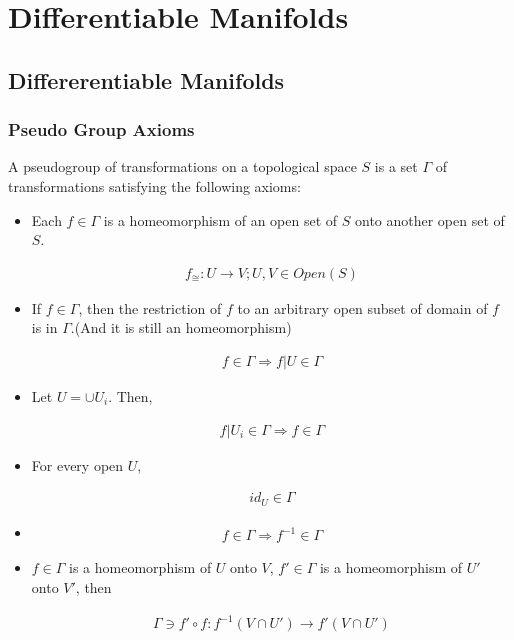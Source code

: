 \documentclass[Total.tex]{subfiles}
\begin{document}
	\chapter{Differentiable Manifolds}
	
		\section{Differerentiable Manifolds}
			\subsection{Pseudo Group Axioms}
				
				\begin{Def}
					A pseudogroup of transformations on a topological space $S$ is a set $\Gamma$ of transformations satisfying the following axioms:
					
					\begin{itemize}
						\item Each $f\in\Gamma$ is a homeomorphism of an open set of $S$ onto another open set of $S$.
						
						\begin{gather*}
							f_{\cong}:U\rightarrow V;U,V\in Open(S)
						\end{gather*}
						\item If $f\in \Gamma$, then the restriction of $f$ to an arbitrary open subset of domain of $f$ is in $\Gamma$.(And it is still an homeomorphism)
						
						\begin{gather*}
							f\in \Gamma\Rightarrow f|U\in \Gamma
						\end{gather*}
						
						\item Let $U=\cup U_i$. Then, 
						
						\begin{gather*}
							f|U_i\in \Gamma\Rightarrow f\in \Gamma
						\end{gather*} 
						\item For every open $U$,
						
						\begin{gather*}
							id_U\in \Gamma
						\end{gather*}
						\item 
						
						\begin{gather*}
							f\in \Gamma\Rightarrow f^{-1}\in \Gamma
						\end{gather*}
						\item $f\in \Gamma$ is a homeomorphism of $U$ onto $V$, $f'\in \Gamma$ is a homeomorphism of $U'$ onto $V'$, then 
						
						\begin{gather*}
							\Gamma\ni f'\circ f:f^{-1}(V\cap U')\rightarrow f'(V\cap U')
						\end{gather*}
					\end{itemize}
				\end{Def}
				
\end{document}
